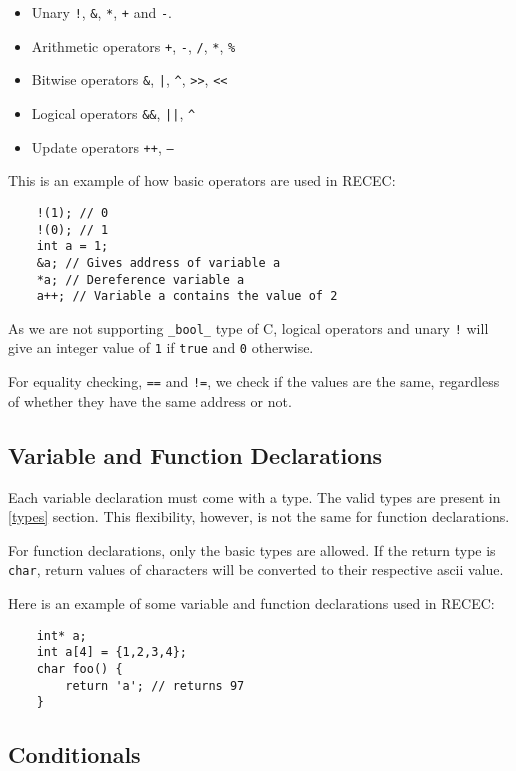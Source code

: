 \documentclass[a4paper]{article}
\begin{document}
\begin{itemize}
	\item Unary \texttt{!}, \texttt{\&}, \texttt{*}, \texttt{+} and \texttt{-}.
	\item Arithmetic operators \texttt{+}, \texttt{-}, \texttt{/}, \texttt{*}, \texttt{\%}
	\item Bitwise operators \texttt{\&}, \texttt{|}, \texttt{\^},  \texttt{>>}, \texttt{<<}
	\item Logical operators \texttt{\&\&}, \texttt{||}, \texttt{\^}
	\item Update operators \texttt{++}, \texttt{--}
\end{itemize}

This is an example of how basic operators are used in RECEC: 

\begin{verbatim}
	!(1); // 0
	!(0); // 1
	int a = 1;
	&a; // Gives address of variable a
	*a; // Dereference variable a
	a++; // Variable a contains the value of 2
\end{verbatim}

As we are not supporting \texttt{\_bool\_} type of C, logical operators and unary \texttt{!} will give an integer value of \texttt{1} if \texttt{true} and \texttt{0} otherwise. 

For equality checking, \texttt{==} and \texttt{!=}, we check if the values are the same, regardless of whether they have the same address or not.

\subsection{Variable and Function Declarations}
Each variable declaration must come with a type. The valid types are present in \ref{types} section. This flexibility, however, is not the same for function declarations. 

For function declarations, only the basic types are allowed. If the return type is \texttt{char}, return values of characters will be converted to their respective ascii value. 

Here is an example of some variable and function declarations used in RECEC: 

\begin{verbatim}
	int* a;
	int a[4] = {1,2,3,4};
	char foo() {
		return 'a'; // returns 97
	}
\end{verbatim}

\subsection{Conditionals}
\end{document}
